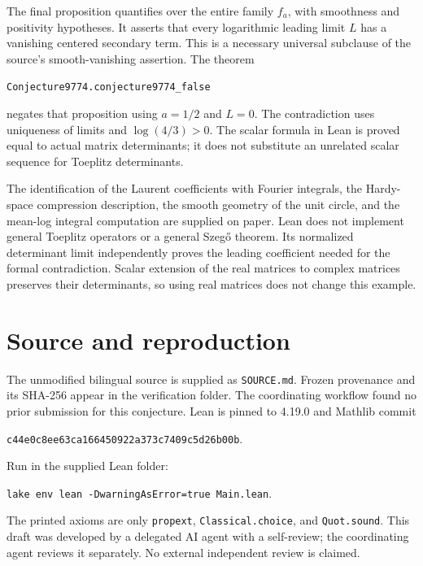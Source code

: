 \documentclass[11pt]{article}
\begin{document}
The final proposition quantifies over the entire family $f_a$, with
smoothness and positivity hypotheses. It asserts that every logarithmic
leading limit $L$ has a vanishing centered secondary term. This is a
necessary universal subclause of the source's smooth-vanishing assertion.
The theorem
\begin{center}\texttt{Conjecture9774.conjecture9774\_false}\end{center}
negates that proposition using $a=1/2$ and $L=0$. The contradiction
uses uniqueness of limits and $\log(4/3)>0$. The scalar formula in Lean
is proved equal to actual matrix determinants; it does not substitute
an unrelated scalar sequence for Toeplitz determinants.

The identification of the Laurent coefficients with Fourier integrals,
the Hardy-space compression description, the smooth geometry of the
unit circle, and the mean-log integral computation are supplied on
paper. Lean does not implement general Toeplitz operators or a general
Szeg\H{o} theorem. Its normalized determinant limit independently proves
the leading coefficient needed for the formal contradiction. Scalar
extension of the real matrices to complex matrices preserves their
determinants, so using real matrices does not change this example.

\section*{Source and reproduction}
The unmodified bilingual source is supplied as \texttt{SOURCE.md}.
Frozen provenance and its SHA-256 appear in the verification folder.
The coordinating workflow found no prior submission for this conjecture.
Lean is pinned to 4.19.0 and Mathlib commit
\begin{center}\texttt{c44e0c8ee63ca166450922a373c7409c5d26b00b}.\end{center}
Run in the supplied Lean folder:
\begin{center}\texttt{lake env lean -DwarningAsError=true Main.lean}.\end{center}
The printed axioms are only \texttt{propext}, \texttt{Classical.choice},
and \texttt{Quot.sound}. This draft was developed by a delegated AI
agent with a self-review; the coordinating agent reviews it separately.
No external independent review is claimed.
\end{document}
